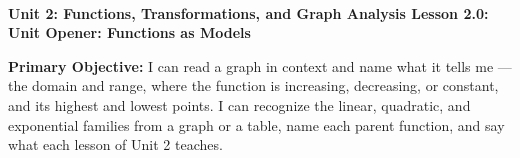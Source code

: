 \documentclass[10pt]{article}
\newcommand{\UnitNumberName}{Unit 2: Functions, Transformations, and Graph Analysis \quad}
\newcommand{\LessonNumberName}{Lesson 2.0: Unit Opener: Functions as Models}
\begin{document}
\begin{center}
    {\Large\bfseries \CourseName \\
    {\small\bfseries \UnitNumberName \LessonNumberName}}
\end{center}

\begin{tcolorbox}[colback=mist, colframe=royal, boxrule=0.9pt, arc=2mm,
    left=2mm, right=2mm, top=1.5mm, bottom=1.5mm]
    \textbf{Primary Objective:} I can read a graph in context and name what it tells me --- the
    domain and range, where the function is increasing, decreasing, or constant, and its highest
    and lowest points. I can recognize the linear, quadratic, and exponential families from a
    graph or a table, name each parent function, and say what each lesson of Unit 2 teaches.
\end{tcolorbox}
\end{document}

